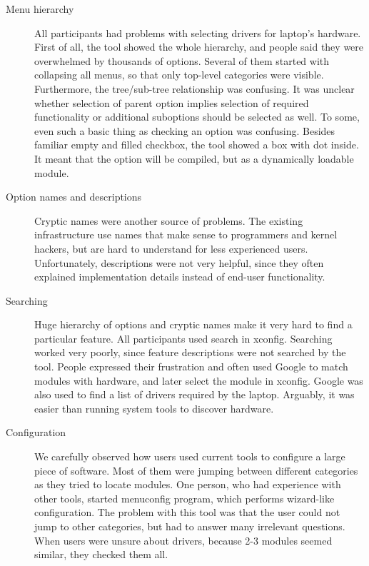 \documentclass{chi2009}
\begin{document}
\begin{description}
  \item[Menu hierarchy]
All participants had problems with selecting drivers for laptop's hardware. First of all, the tool showed the whole hierarchy, and people said they were overwhelmed by thousands of options. Several of them started with collapsing all menus, so that only top-level categories were visible. Furthermore, the tree/sub-tree relationship was confusing. It was unclear whether selection of parent option implies selection of required functionality or additional suboptions should be selected as well. To some, even such a basic thing as checking an option was confusing. Besides familiar empty and filled checkbox, the tool showed a box with dot inside. It meant that the option will be compiled, but as a dynamically loadable module.

  \item[Option names and descriptions]
Cryptic names were another source of problems. The existing infrastructure use names that make sense to programmers and kernel hackers, but are hard to understand for less experienced users. Unfortunately, descriptions were not very helpful, since they often explained implementation details instead of end-user functionality.

  \item[Searching]
Huge hierarchy of options and cryptic names make it very hard to find a particular feature. All participants used search in \textsf{xconfig}. Searching worked very poorly, since feature descriptions were not searched by the tool. People expressed their frustration and often used Google to match modules with hardware, and later select the module in \textsf{xconfig}. Google was also used to find a list of drivers required by the laptop. Arguably, it was easier than running system tools to discover hardware.

  \item[Configuration]
We carefully observed how users used current tools to configure a large piece of software. Most of them were jumping between different categories as they tried to locate modules. One person, who had experience with other tools, started \textsf{menuconfig} program, which performs wizard-like configuration. The problem with this tool was that the user could not jump to other categories, but had to answer many irrelevant questions. When users were unsure about drivers, because 2-3 modules seemed similar, they checked them all. 
\end{description}
\end{document}
